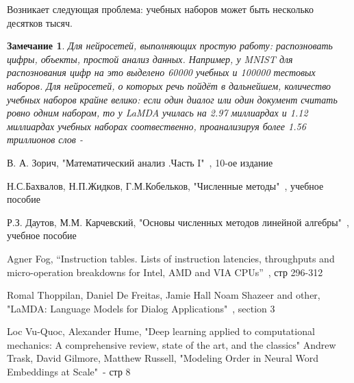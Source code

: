 \documentclass[12pt]{extarticle}
\newtheorem*{remark}{Замечание}
\begin{document}
	Возникает следующая проблема: учебных наборов может быть несколько десятков тысяч.
	
	\begin{remark}
		Для нейросетей, выполняющих простую работу: распозновать цифры, объекты, простой анализ данных. Например, у MNIST для распознования цифр на это выделено 60000 учебных и 100000 тестовых наборов. Для нейросетей, о которых речь пойдёт в дальнейшем, количество учебных наборов крайне велико: если один диалог или один документ считать ровно одним набором, то у LaMDA училась на 2.97 миллиардах и 1.12 миллиардах учебных наборах соотвественно, проанализируя более 1.56 триллионов слов - \cite{litlink5}
	\end{remark} 
	
	\newpage	
{}
 
\begin{thebibliography}{}
     В. А. Зорич, "Математический анализ .Часть I"\ , 10-ое издание

      Н.С.Бахвалов, Н.П.Жидков, Г.М.Кобельков,
"Численные методы"\ , учебное пособие

     Р.З. Даутов, М.М. Карчевский, "Основы численных методов линейной алгебры"\ , учебное пособие
    
     Agner Fog, “Instruction tables. Lists of instruction latencies, throughputs and micro-operation breakdowns for Intel, AMD and VIA CPUs”\ , стр 296-312 \newline
    
     Romal Thoppilan, Daniel De Freitas, Jamie Hall Noam Shazeer and other,   "LaMDA: Language Models for Dialog Applications"\ , section 3
    
     Loc Vu-Quoc, Alexander Hume, "Deep learning applied to computational mechanics: A comprehensive review, state of the art, and the classics"
     Andrew Trask, David Gilmore, Matthew Russell, "Modeling Order in Neural Word Embeddings at Scale"\ - стр 8
    
\end{thebibliography}
\end{document}
